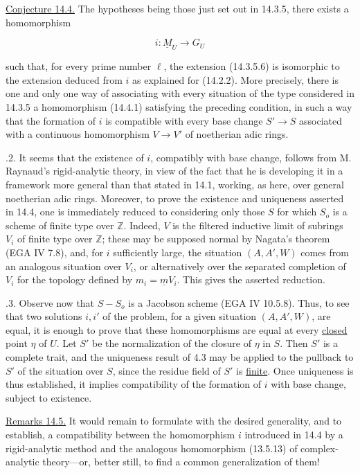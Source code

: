 \par\medskip
\noindent
\underline{Conjecture 14.4.}  The hypotheses being those just set out in
14.3.5, there exists a homomorphism

\begin{equation}\tag{14.4.1}
 i:\underline M_U\longrightarrow G_U
\end{equation}

\noindent
such that, for every prime number $\ell$, the extension (14.3.5.6) is
isomorphic to the extension deduced from $i$ as explained for (14.2.2).
More precisely, there is one and only one way of associating with every
situation of the type considered in 14.3.5 a homomorphism (14.4.1)
satisfying the preceding condition, in such a way that the formation of
$i$ is compatible with every base change $S'\longrightarrow S$
associated with a continuous homomorphism $V\longrightarrow V'$ of
noetherian adic rings.

\medskip
{}.2. It seems that the existence of $i$, compatibly with base change,
follows from M. Raynaud's rigid-analytic theory, in view of the fact that
he is developing it in a framework more general than that stated in
14.1, working, as here, over general noetherian adic rings.  Moreover,
to prove the existence and uniqueness asserted in 14.4, one is
immediately reduced to considering only those $S$ for which $S_o$ is a
scheme of finite type over $\mathbb Z$.  Indeed, $V$ is the filtered
inductive limit of subrings $V_i$ of finite type over $\mathbb Z$; these
may be supposed normal by Nagata's theorem (EGA IV 7.8), and, for $i$
sufficiently large, the situation $(A,A',W)$ comes from an analogous
situation over $V_i$, or alternatively over the separated completion of
$V_i$ for the topology defined by $m_i=\underline m V_i$.  This gives
the asserted reduction.

\medskip
{}.3. Observe now that $S-S_o$ is a Jacobson scheme (EGA IV 10.5.8).
Thus, to see that two solutions $i,i'$ of the problem, for a given
situation $(A,A',W)$, are equal, it is enough to prove that these
homomorphisms are equal at every \underline{closed} point $\eta$ of
$U$.  Let $S'$ be the normalization of the closure of $\eta$ in $S$.
Then $S'$ is a complete trait, and the uniqueness result of 4.3 may be
applied to the pullback to $S'$ of the situation over $S$, since the
residue field of $S'$ is \underline{finite}.  Once uniqueness is thus
established, it implies compatibility of the formation of $i$ with base
change, subject to existence.

\medskip
\noindent
\underline{Remarks 14.5.}  It would remain to formulate with the desired
generality, and to establish, a compatibility between the homomorphism
$i$ introduced in 14.4 by a rigid-analytic method and the analogous
homomorphism (13.5.13) of complex-analytic theory---or, better still, to
find a common generalization of them!

